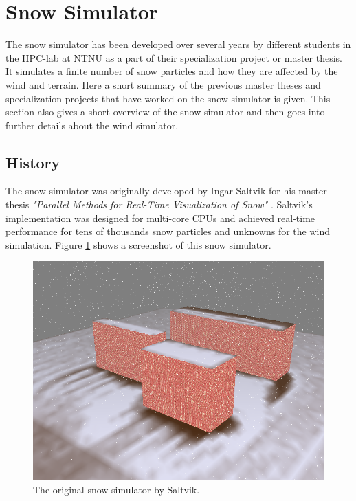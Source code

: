 \section{Snow Simulator}

The snow simulator has been developed over several years by different students in 
the HPC-lab at NTNU as a part of their specialization project or master thesis. 
It simulates a finite number of snow particles and how they are affected by the 
wind and terrain. Here a short summary of the previous master theses and 
specialization projects that have worked on the snow simulator is given. This 
section also gives a short overview of the snow simulator and then goes into 
further details about the wind simulator.

\subsection{History}


The snow simulator was originally developed by Ingar Saltvik for his master
thesis \emph{"Parallel Methods for Real-Time Visualization of Snow"}
\cite{originalSnowThesis}. Saltvik's implementation was designed for multi-core
CPUs and achieved real-time performance for tens of thousands snow particles
and unknowns for the wind simulation. Figure \ref{fig:originalSnow} shows a 
screenshot of this snow simulator.

\begin{figure}[ht]
	\center
	\includegraphics[width=1.0\textwidth]{images/snow/serial/snow5}
	\caption{The original snow simulator by Saltvik.}
	\label{fig:originalSnow}
\end{figure}

